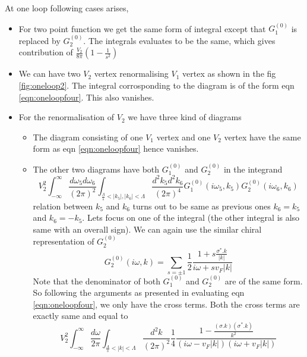 \documentclass[a4paper,crop=false]{standalone}
\begin{document}
        At one loop following cases arises,
        \begin{itemize}
            \item For two point function we get the same form of integral except that $G^{(0)}_1$ is replaced by $G^{(0)}_2$. The integrals evaluates to be the same, which gives contribution of $\frac{V_2}{8\pi}\left(1 - \frac{1}{s^2}\right)$
            \item We can have two $V_2$ vertex renormalising $V_1$ vertex as shown in the fig \ref{fig:oneloop2}. The integral corrosponding to the diagram is of the form eqn \ref{eqn:oneloopfour}. This also vanishes.
            \item For the renormalisation of $V_2$ we have three kind of diagrams
                \begin{itemize}
                    \item The diagram consisting of one $V_1$ vertex and one $V_2$ vertex have the same form as eqn \ref{eqn:oneloopfour} hence vanishes.
                    \item The other two diagrams have both $G^{(0)}_1$ and $G^{(0)}_2$ in the integrand
                        \begin{equation}
                            V^2_2\int^{\infty}_{-\infty}\frac{d\omega_5d\omega_6}{(2\pi)^2}\int_{\frac{\Lambda}{s}<|k_5|,|k_6|<\Lambda}\frac{d^2k_5d^2k_6}{(2\pi)^4} G^{(0)}_1(i\omega_5,k_5)G^{(0)}_2(i\omega_6,k_6)
                        \end{equation}
                        relation between $k_5$ and $k_6$ turns out to be same as previous ones $k_6 = k_5$ and $k_6 = - k_5$. Lets focus on one of the integral (the other integral is also same with an overall sign). We can again use the similar chiral representation of $G^{(0)}_2$
                        \begin{equation}
                            G^{(0)}_{2}(i\omega,k) = \sum_{s=\pm 1}\frac{1}{2}\frac{1+s\frac{\sigma^{*} . k}{|k|}}{i\omega + sv_F|k|}
                        \end{equation}
                        Note that the denominator of both $G^{(0)}_1$ and $G^{(0)}_2$ are of the same form. So following the arguments as presented in evaluating eqn \ref{eqn:oneloopfour}, we only have the cross terms. Both the cross terms are exactly same and equal to
                        \begin{equation}
                            V^2_2\int^{\infty}_{-\infty}\frac{d\omega}{2\pi}\int_{\frac{\Lambda}{s}<|k|<\Lambda}\frac{d^2k}{(2\pi)^2} \frac{1}{4}\frac{1 - \frac{(\sigma . k)(\sigma^{*} . k)}{k^2}}{(i\omega - v_F|k|)(i\omega + v_F|k|)}

\end{equation}
\end{itemize}
\end{itemize}
\end{document}
